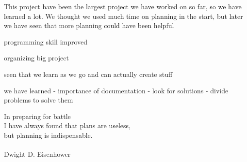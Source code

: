 This project have been the largest project we have worked on so far, so we have
learned a lot. We thought we used much time on planning in the start, but later
we have seen that more planning could have been helpful

programming skill improved

organizing big project

seen that we learn as we go and can actually create stuff

we have learned
 - importance of documentation
 - look for solutions
 - divide problems to solve them 


\vfill{}

\begin{center}
	In preparing for battle\\
	I have always found that plans are useless,\\
	but planning is indispensable. \\
	\paragraph{}
	\hfill{}\hfill{} Dwight D. Eisenhower \cite{Eisenhower}\hfill{}\hfill{}
\end{center}

\vfill{}